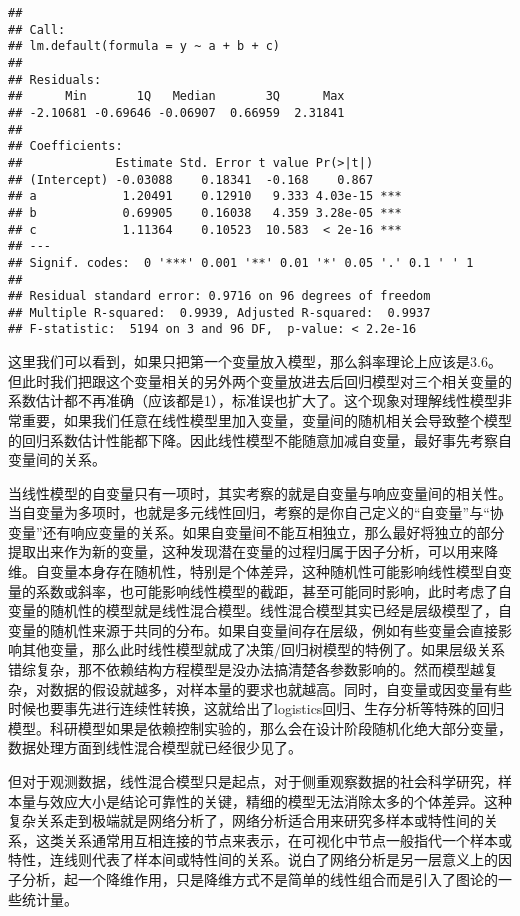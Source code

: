 \documentclass[]{tufte-book}
\begin{document}
\begin{verbatim}
## 
## Call:
## lm.default(formula = y ~ a + b + c)
## 
## Residuals:
##      Min       1Q   Median       3Q      Max 
## -2.10681 -0.69646 -0.06907  0.66959  2.31841 
## 
## Coefficients:
##             Estimate Std. Error t value Pr(>|t|)    
## (Intercept) -0.03088    0.18341  -0.168    0.867    
## a            1.20491    0.12910   9.333 4.03e-15 ***
## b            0.69905    0.16038   4.359 3.28e-05 ***
## c            1.11364    0.10523  10.583  < 2e-16 ***
## ---
## Signif. codes:  0 '***' 0.001 '**' 0.01 '*' 0.05 '.' 0.1 ' ' 1
## 
## Residual standard error: 0.9716 on 96 degrees of freedom
## Multiple R-squared:  0.9939, Adjusted R-squared:  0.9937 
## F-statistic:  5194 on 3 and 96 DF,  p-value: < 2.2e-16
\end{verbatim}

这里我们可以看到，如果只把第一个变量放入模型，那么斜率理论上应该是3.6。但此时我们把跟这个变量相关的另外两个变量放进去后回归模型对三个相关变量的系数估计都不再准确（应该都是1），标准误也扩大了。这个现象对理解线性模型非常重要，如果我们任意在线性模型里加入变量，变量间的随机相关会导致整个模型的回归系数估计性能都下降。因此线性模型不能随意加减自变量，最好事先考察自变量间的关系。

当线性模型的自变量只有一项时，其实考察的就是自变量与响应变量间的相关性。当自变量为多项时，也就是多元线性回归，考察的是你自己定义的``自变量''与``协变量''还有响应变量的关系。如果自变量间不能互相独立，那么最好将独立的部分提取出来作为新的变量，这种发现潜在变量的过程归属于因子分析，可以用来降维。自变量本身存在随机性，特别是个体差异，这种随机性可能影响线性模型自变量的系数或斜率，也可能影响线性模型的截距，甚至可能同时影响，此时考虑了自变量的随机性的模型就是线性混合模型。线性混合模型其实已经是层级模型了，自变量的随机性来源于共同的分布。如果自变量间存在层级，例如有些变量会直接影响其他变量，那么此时线性模型就成了决策/回归树模型的特例了。如果层级关系错综复杂，那不依赖结构方程模型是没办法搞清楚各参数影响的。然而模型越复杂，对数据的假设就越多，对样本量的要求也就越高。同时，自变量或因变量有些时候也要事先进行连续性转换，这就给出了logistics回归、生存分析等特殊的回归模型。科研模型如果是依赖控制实验的，那么会在设计阶段随机化绝大部分变量，数据处理方面到线性混合模型就已经很少见了。

但对于观测数据，线性混合模型只是起点，对于侧重观察数据的社会科学研究，样本量与效应大小是结论可靠性的关键，精细的模型无法消除太多的个体差异。这种复杂关系走到极端就是网络分析了，网络分析适合用来研究多样本或特性间的关系，这类关系通常用互相连接的节点来表示，在可视化中节点一般指代一个样本或特性，连线则代表了样本间或特性间的关系。说白了网络分析是另一层意义上的因子分析，起一个降维作用，只是降维方式不是简单的线性组合而是引入了图论的一些统计量。
\end{document}
